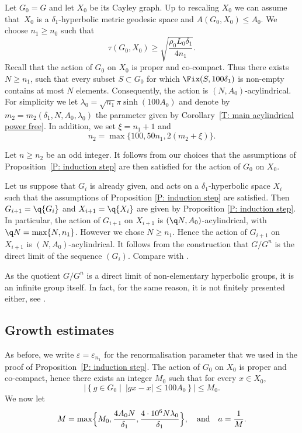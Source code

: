 Let $G_0=G$ and let $X_0$ be its Cayley graph.
Up to rescaling $X_0$ we can assume that~$X_0$ is a $\delta_1$-hyperbolic metric geodesic space and $A(G_0, X_0) \leq A_0$.
We choose $n_1 \geq n_0$ such that
\begin{equation*}
\tau(G_0, X_0) \geq \sqrt{\frac{\rho_0 L_0 \delta_1}{4n_1}}.
\end{equation*}
Recall that the action of $G_0$ on $X_0$ is proper and co-compact.
Thus there exists $N \geq n_1$, such that every subset $S \subset G_0$ for which $\Fix(S,100\delta_1)$ is non-empty contains at most $N$ elements.
Consequently, the action is $(N, A_0)$-acylindrical.
For simplicity we let $\lambda_0 = \sqrt{n_1} \pi \sinh\left( 100A_0\right)$ and denote by $m_2 = m_2(\delta_1, N, A_0, \lambda_0)$ the parameter given by Corollary~\ref{T: main acylindrical power free}.
In addition, we set $\xi = n_1 + 1$ and
\begin{equation*}
n_2 = \max\{ 100, 50n_1, 2(m_2 + \xi)\}.
\end{equation*}

Let $n \geq n_2$ be an odd integer.
It follows from our choices that the assumptions of Proposition~\ref{P: induction step} are then satisfied for the action of $G_0$ on $X_0$.

Let us suppose that $G_i$ is already given, and acts on a $\delta_1$-hyperbolic space $X_i$ such that the assumptions of Proposition \ref{P: induction step} are satisfied. Then $G_{i+1}=\q {G_{i}}$ and $X_{i+1}= \q {X_i}$ are given by Proposition \ref{P: induction step}.
In particular, the action of $G_{i+1}$ on $X_{i+1}$ is $(\q N, A_0)$-acylindrical, with $\q N = \max\{ N , n_1\}$.
However we chose $N \geq n_1$.
Hence the action of $G_{i+1}$ on $X_{i+1}$ is $(N,A_0)$-acylindrical.
It follows from the construction that $G/G^n$ is the direct limit of the sequence $(G_i)$. Compare with \cite[Th.\,7.7]{coulon_geometry_2014}.

\begin{rem} As the quotient $G/G^n$ is a direct limit of non-elementary hyperbolic groups, it is an infinite group itself. In fact, for the same reason, it is not finitely presented either, see \cite[Th.\,7.7]{coulon_geometry_2014}.
\end{rem}

\subsection{Growth estimates}
\label{sec: growth estimates}
As before, we write $\varepsilon = \varepsilon_{n_1}$ for the renormalisation parameter that we used in the proof of Proposition~\ref{P: induction step}.
The action of $G_0$ on $X_0$ is proper and co-compact, hence there exists an integer $M_0$ such that for every $x \in X_0$,
\begin{equation*}
\left| \left\{ g \in G_0 \mid \ |gx - x| \leq100 A_0\right\}\right| \leq M_0.
\end{equation*}
We now let
\begin{equation*}
M = \max \Bigl\{
M_0,
\frac{4A_0N}{\delta_1},
\frac{4\cdot 10^6 N \lambda_0}{\delta_1}
\Bigr\},
\quad \text{and} \quad
a = \frac 1M.
\end{equation*}

